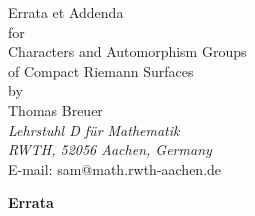 \documentclass[12pt,twoside]{article}
\def\tthdump#1{#1}
\begin{document}
\parskip3mm
\parindent0pt

\tthdump{\vspace*{-2cm}}

\begin{center}
\tthdump{\large Errata et Addenda} \\[0.5cm]
{\normalsize for} \\[0.5cm]
{\large Characters and Automorphism Groups \\
of Compact Riemann Surfaces} \\[0.5cm]
{\normalsize by} \\[0.5cm]
{\large Thomas Breuer \\[0.5cm]
{\normalsize
\textit{Lehrstuhl D f{\"u}r Mathematik} \\
\textit{RWTH, 52056 Aachen, Germany} \\
E-mail: sam@math.rwth-aachen.de}}
\end{center}


\vspace*{1cm}
\centerline{\large\bf Errata}
\end{document}
